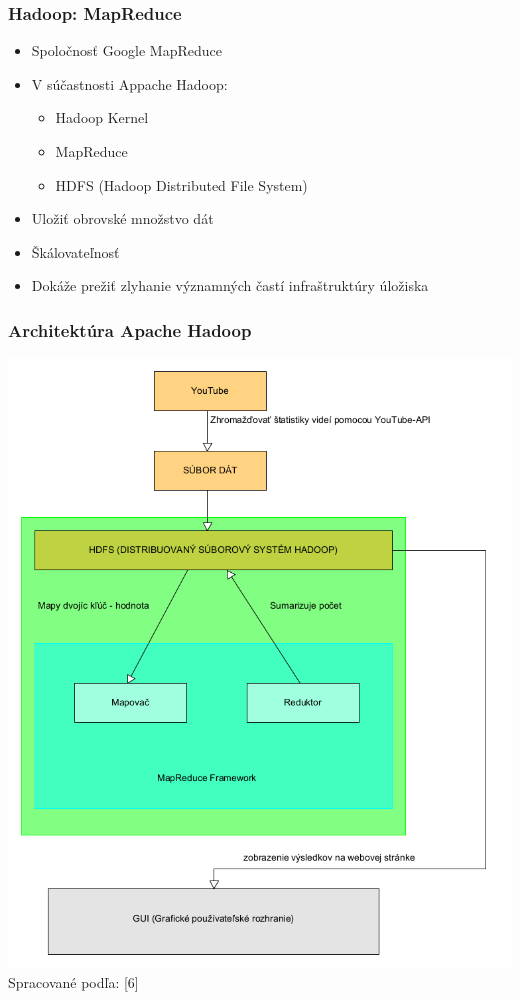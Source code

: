 \documentclass{beamer}
\begin{document}
\begin{frame}[fragile=singleslide]\frametitle{Hadoop: MapReduce}
\begin{itemize}
\item Spoločnosť Google MapReduce
\item V súčastnosti Appache Hadoop:
	\begin{itemize}
	\item Hadoop Kernel
	\item MapReduce
	\item HDFS (Hadoop Distributed File System)
	\end{itemize}
\item Uložiť obrovské množstvo dát
\item Škálovateľnosť
\item Dokáže prežiť zlyhanie významných častí infraštruktúry úložiska
\end{itemize}
\end{frame}


\begin{frame}[fragile=singleslide]\frametitle{Architektúra Apache Hadoop}
\includegraphics[scale=.23]{HDFS_prelozene.png}
{\tiny Spracované podľa: [6]}
\end{frame}
\end{document}
